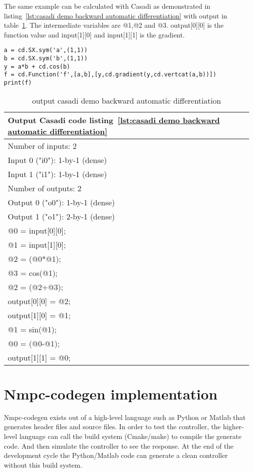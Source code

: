 The same example can be calculated with Casadi as demonstrated in listing~\ref{lst:casadi demo backward automatic differentiation} with output in table~\ref{tbl:output casadi demo backward automatic differentiation}. The intermediate variables are @1,@2 and @3. output[0][0] is the function value and input[1][0] and input[1][1] is the gradient. 

\begin{lstlisting}[caption={Casadi example automatic backward differentiation},label={lst:casadi demo backward automatic differentiation}]
a = cd.SX.sym('a',(1,1))
b = cd.SX.sym('b',(1,1))
y = a*b + cd.cos(b)
f = cd.Function('f',[a,b],[y,cd.gradient(y,cd.vertcat(a,b))])
print(f)
\end{lstlisting}


\begin{table}
	\begin{center}
		\begin{tabular}{ |l|  }
			\hline
			Output Casadi code listing~\ref{lst:casadi demo backward automatic differentiation} \\
			\hline
			Number of inputs: 2 \\
			Input 0 ("i0"): 1-by-1 (dense) \\
			Input 1 ("i1"): 1-by-1 (dense) \\
			Number of outputs: 2 \\
			Output 0 ("o0"): 1-by-1 (dense) \\
			Output 1 ("o1"): 2-by-1 (dense) \\
			@0 = input[0][0]; \\
			@1 = input[1][0]; \\
			@2 = (@0*@1); \\
			@3 = cos(@1); \\
			@2 = (@2+@3); \\
			output[0][0] = @2; \\
			output[1][0] = @1; \\
			@1 = sin(@1); \\
			@0 = (@0-@1); \\
			output[1][1] = @0; \\
			\hline   
		\end{tabular}
		\caption{output casadi demo backward automatic differentiation}
		\label{tbl:output casadi demo backward automatic differentiation}
	\end{center}
\end{table}


\section{Nmpc-codegen implementation}
Nmpc-codegen exists out of a high-level language such as Python or Matlab that generates header files and source files. In order to test the controller, the higher-level language can call the build system (Cmake/make) to compile the generate code. And then simulate the controller to see the response. At the end of the development cycle the Python/Matlab code can generate a clean controller without this build system.

